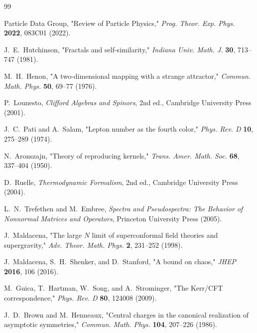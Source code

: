 \documentclass[12pt,a4paper]{article}
\begin{document}
\begin{thebibliography}{99}

Particle Data Group, "Review of Particle Physics," 
\textit{Prog. Theor. Exp. Phys.} \textbf{2022}, 083C01 (2022).

J.~E.~Hutchinson, "Fractals and self-similarity," 
\textit{Indiana Univ. Math. J.} \textbf{30}, 713--747 (1981).

M.~H.~Henon, "A two-dimensional mapping with a strange attractor," 
\textit{Commun. Math. Phys.} \textbf{50}, 69--77 (1976).

P.~Lounesto, \textit{Clifford Algebras and Spinors}, 
2nd ed., Cambridge University Press (2001).

J.~C.~Pati and A.~Salam, "Lepton number as the fourth color," 
\textit{Phys. Rev. D} \textbf{10}, 275--289 (1974).

N.~Aronszajn, "Theory of reproducing kernels," 
\textit{Trans. Amer. Math. Soc.} \textbf{68}, 337--404 (1950).

D.~Ruelle, \textit{Thermodynamic Formalism}, 
2nd ed., Cambridge University Press (2004).

L.~N.~Trefethen and M.~Embree, 
\textit{Spectra and Pseudospectra: The Behavior of Nonnormal Matrices and Operators},
Princeton University Press (2005).

J.~Maldacena, "The large $N$ limit of superconformal field theories and 
supergravity," \textit{Adv. Theor. Math. Phys.} \textbf{2}, 231--252 (1998).

J.~Maldacena, S.~H.~Shenker, and D.~Stanford, 
"A bound on chaos," \textit{JHEP} \textbf{2016}, 106 (2016).

M.~Guica, T.~Hartman, W.~Song, and A.~Strominger, 
"The Kerr/CFT correspondence," \textit{Phys. Rev. D} \textbf{80}, 124008 (2009).

J.~D.~Brown and M.~Henneaux, "Central charges in the canonical realization 
of asymptotic symmetries," \textit{Commun. Math. Phys.} \textbf{104}, 207--226 (1986).

\end{thebibliography}
\end{document}
